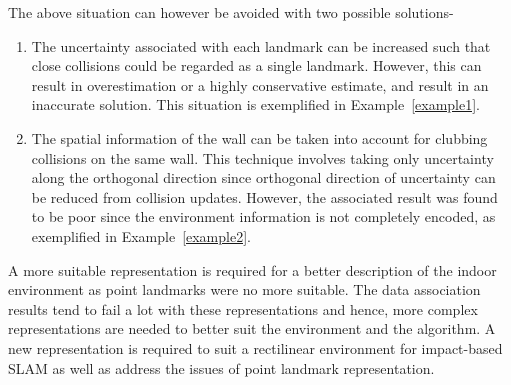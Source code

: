 The above situation can however be avoided with two possible solutions-
\begin{enumerate}
\item The uncertainty associated with each landmark can be increased such that close collisions could be regarded as a single landmark. However, this can result in overestimation or a highly conservative estimate, and result in an inaccurate solution. This situation is exemplified in Example~\ref{example1}.  
\item The spatial information of the wall can be taken into account for clubbing collisions on the same wall. This technique involves taking only uncertainty along the orthogonal direction since orthogonal direction of uncertainty can be reduced from collision updates. However, the associated result was found to be poor since the environment information is not completely encoded, as exemplified in Example~\ref{example2}.
\end{enumerate}

A more suitable representation is required for a better description of the indoor environment as point landmarks were no more suitable. The data association results tend to fail a lot with these representations and hence, more complex representations are needed to better suit the environment and the algorithm. A new representation is required to suit a rectilinear environment for impact-based SLAM as well as address the issues of point landmark representation.

